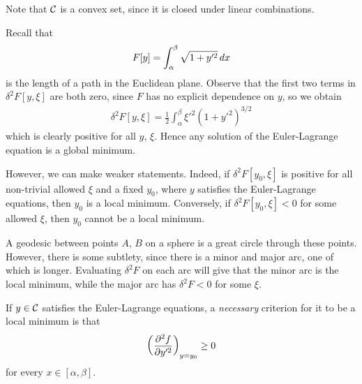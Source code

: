 \documentclass{../../template/note}
\begin{document}
    \begin{remark*}
        Note that $\mathcal{C}$ is a convex set, since it is closed under linear combinations.
    \end{remark*}
    
    \begin{example*}
        Recall that
        \begin{align*}
            F[y] = \int_\alpha^\beta \sqrt{1 + y'^2} \,d{x}
        \end{align*}
        is the length of a path in the Euclidean plane. Observe that the first two terms in $\delta^2 F[y, \xi]$ are both zero, since $F$ has no explicit dependence on $y$, so we obtain
        \begin{align*}
            \delta^2 F[y, \xi] = \frac 1 2 \int_\alpha^\beta \xi'^2 \left(1 + y'^2\right)^{3/2}
        \end{align*}
        which is clearly positive for all $y$, $\xi$. Hence any solution of the Euler-Lagrange equation is a global minimum.
    \end{example*}
    
    However, we can make weaker statements. Indeed, if $\delta^2 F[y_0, \xi]$ is positive for all non-trivial allowed $\xi$ and a fixed $y_0$, where $y$ satisfies the Euler-Lagrange equations, then $y_0$ is a local minimum. Conversely, if $\delta^2 F[y_0, \xi] < 0$ for some allowed $\xi$, then $y_0$ cannot be a local minimum.
    
    \begin{example*}
        A geodesic between points $A$, $B$ on a sphere is a great circle through these points. However, there is some subtlety, since there is a minor and major arc, one of which is longer. Evaluating $\delta^2 F$ on each arc will give that the minor arc is the local minimum, while the major arc has $\delta^2 F < 0$ for some $\xi$.
    \end{example*}
    
    \begin{proposition}
        If $y \in \mathcal{C}$ satisfies the Euler-Lagrange equations, a \emph{necessary} criterion for it to be a local minimum is that
        \begin{align*}
            \left(\pd{^2f}{y'^2}\right)_{y=y_0} \geq 0
        \end{align*}
        for every $x \in [\alpha, \beta]$.        
    \end{proposition}
    
\end{document}
